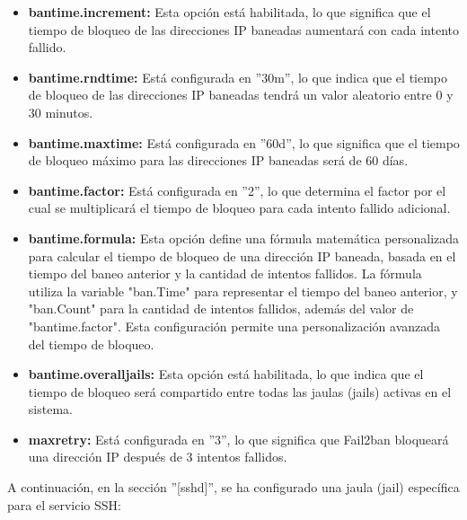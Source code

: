 				\begin{itemize}
					\item \textbf{bantime.increment:} Esta opción está habilitada, lo que significa que el tiempo de bloqueo de las direcciones IP baneadas aumentará con cada intento fallido.
				
					\item \textbf{bantime.rndtime:} Está configurada en ''30m'', lo que indica que el tiempo de bloqueo de las direcciones IP baneadas tendrá un valor aleatorio entre 0 y 30 minutos.
				
					\item \textbf{bantime.maxtime:} Está configurada en ''60d'', lo que significa que el tiempo de bloqueo máximo para las direcciones IP baneadas será de 60 días.
				
					\item \textbf{bantime.factor:} Está configurada en ''2'', lo que determina el factor por el cual se multiplicará el tiempo de bloqueo para cada intento fallido adicional.
				
					\item \textbf{bantime.formula:} Esta opción define una fórmula matemática personalizada para calcular el tiempo de bloqueo de una dirección IP baneada, basada en el tiempo del baneo anterior y la cantidad de intentos fallidos. La fórmula utiliza la variable "ban.Time" para representar el tiempo del baneo anterior, y "ban.Count" para la cantidad de intentos fallidos, además del valor de "bantime.factor". Esta configuración permite una personalización avanzada del tiempo de bloqueo.
				
					\item \textbf{bantime.overalljails:} Esta opción está habilitada, lo que indica que el tiempo de bloqueo será compartido entre todas las jaulas (jails) activas en el sistema.
				
					\item \textbf{maxretry:} Está configurada en ''3'', lo que significa que Fail2ban bloqueará una dirección IP después de 3 intentos fallidos.
				\end{itemize}
				
				A continuación, en la sección ''[sshd]'', se ha configurado una jaula (jail) específica para el servicio SSH:\par
				
